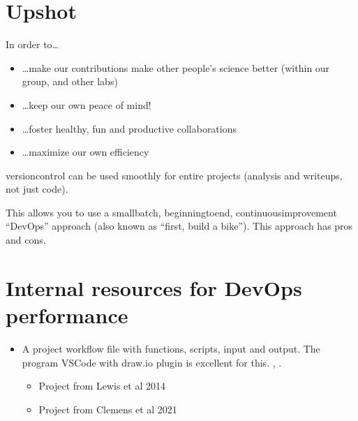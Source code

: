 \documentclass[letterpaper,10pt,english]{sphinxmanual}
\let\sphinxpxdimen\pdfpxdimen\else\newdimen\sphinxpxdimen
\begin{document}
\section{Upshot}
\label{\detokenize{03DevOps:upshot}}
\sphinxAtStartPar
In order to…
\begin{itemize}
\item {} 
\sphinxAtStartPar
…make our contributions make other people’s science better (within our group, and other labs)

\item {} 
\sphinxAtStartPar
…keep our own peace of mind!

\item {} 
\sphinxAtStartPar
…foster healthy, fun and productive collaborations

\item {} 
\sphinxAtStartPar
…maximize our own efficiency

\end{itemize}

\sphinxAtStartPar
version\sphinxhyphen{}control can be used smoothly for entire projects (analysis and write\sphinxhyphen{}ups, not just code).

\sphinxAtStartPar
This allows you to use a small\sphinxhyphen{}batch, beginning\sphinxhyphen{}to\sphinxhyphen{}end, continuous\sphinxhyphen{}improvement “DevOps” approach (also known as “first, build a bike”). This approach has pros and cons.

\noindent\sphinxincludegraphics[width=600\sphinxpxdimen]{{figDevOps}.pdf}


\section{Internal resources for DevOps performance}
\label{\detokenize{03DevOps:internal-resources-for-devops-performance}}\begin{itemize}
\item {} 
\sphinxAtStartPar
A project workflow file with functions, scripts, input and output. The program VSCode with draw.io plugin is excellent for this. , .
\begin{itemize}
\item {} 
\sphinxAtStartPar
Project  from Lewis et al 2014

\item {} 
\sphinxAtStartPar
Project  from Clemens et al 2021

\end{itemize}

\end{itemize}
\end{document}
